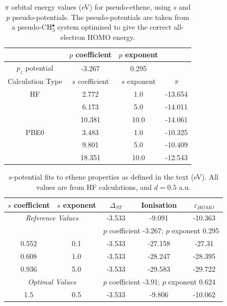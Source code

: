 \documentclass[12pt]{article}
\begin{document}
\newpage

\begin{table}[ht]
\begin{tabular}{c c c c}
\hline
& \(p\) coefficient & \(p\) exponent \\
\hline
\(p_{z}\) potential & -3.267 & 0.295 \\
\hline
Calculation Type & \(s\) coefficient & \(s\) exponent & \(\pi\) \\
\hline
HF & 2.772 & 1.0 & -13.654 \\
 & 6.173 & 5.0 & -14.011 \\
 & 10.381 & 10.0 & -14.061 \\
\hline
PBE0 & 3.483 & 1.0 & -10.325 \\
 & 9.801 & 5.0 & -10.409 \\
 & 18.351 & 10.0 & -12.543 \\
\hline
\end{tabular}
\caption{\(\pi\) orbital energy values (eV) for pseudo-ethene, using \(s\) and \(p\) pseudo-potentials.
The pseudo-potentials are taken from a pseudo-CH\(^{\bullet}_{3}\) system optimised to give the correct all-electron HOMO energy.}
\label{table:p_potentials}
\end{table}

\newpage

\begin{table}[ht]
\begin{tabular}{c c c c c}
\hline
\(s\) coefficient & \(s\) exponent & $\Delta_{ST}$  & Ionisation  & $\varepsilon_{HOMO}$  \\
\hline
\multicolumn{2}{c}{\textit{Reference Values}} & -3.533 & -9.091 & -10.363 \\
\hline
&& \multicolumn{3}{l}{\(p\) coefficient -3.267; \(p\) exponent 0.295} \\
\hline
0.552 & 0.1 & -3.533 & -27.158 & -27.31 \\
0.608 & 1.0 & -3.533 & -28.247 & -28.395 \\
0.936 & 5.0 & -3.533 & -29.583 & -29.722 \\
\hline
\multicolumn{2}{c}{\textit{Optimal Values}} &\multicolumn{3}{l}{\(p\) coefficient -3.91; \(p\) exponent 0.624} \\
\hline
1.5 & 0.5 & -3.533 & -9.806 & -10.062 \\
\hline
\end{tabular}
\caption{\(s\)-potential fits to ethene properties as defined in the text (eV). All values are from HF calculations, and \(d = 0.5\) a.u.}
\label{table:ethene_excitations}
\end{table}
\end{document}
